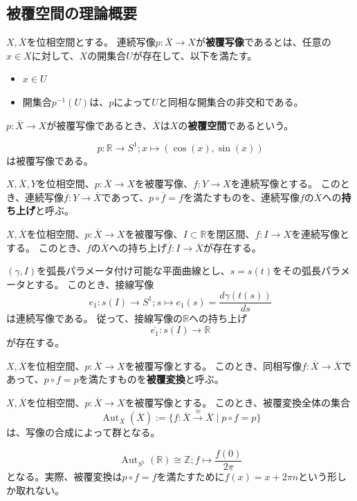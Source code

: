 \subsection{被覆空間の理論概要}
\begin{definition}[被覆空間]
  $X,\overline{X}$を位相空間とする。
  連続写像$p:\overline{X}\to X$が\textbf{被覆写像}であるとは、任意の$x\in X$に対して、$X$の開集合$U$が存在して、以下を満たす。
  \begin{itemize}
    \item $x\in U$
    \item 開集合$p^{-1}(U)$は、$p$によって$U$と同相な開集合の非交和である。
  \end{itemize}
  $p:\overline{X}\to X$が被覆写像であるとき、$\overline{X}$は$X$の\textbf{被覆空間}であるという。
\end{definition}
\begin{example}
  \[
    p:\mathbb{R}\to S^1;x\mapsto(\cos(x),\sin(x))
  \]
  は被覆写像である。
\end{example}

\begin{definition}
  $X,\overline{X},Y$を位相空間、$p:\overline{X}\to X$を被覆写像、$f:Y\to X$を連続写像とする。
  このとき、連続写像$\overline{f}:Y\to\overline{X}$であって、$p\circ\overline{f}=f$を満たすものを、連続写像$f$の$\overline{X}$への\textbf{持ち上げ}と呼ぶ。
\end{definition}
\begin{theorem}[道の持ち上げ定理]
  $X,\overline{X}$を位相空間、$p:\overline{X}\to X$を被覆写像、$I\subset\mathbb{R}$を閉区間、$f:I\to X$を連続写像とする。
  このとき、$f$の$\overline{X}$への持ち上げ$\overline{f}:I\to\overline{X}$が存在する。
\end{theorem}
\begin{example}
  $(\gamma,I)$を弧長パラメータ付け可能な平面曲線とし、$s=s(t)$をその弧長パラメータとする。
  このとき、接線写像
  \[
    e_1:s(I)\to S^1;s\mapsto e_1(s)=\frac{d\gamma(t(s))}{ds}
  \]
  は連続写像である。
  従って、接線写像の$\mathbb{R}$への持ち上げ
  \[
    \overline{e_1}:s(I)\to\mathbb{R}
  \]
  が存在する。
\end{example}

\begin{definition}[被覆変換群]
  $X,\overline{X}$を位相空間、$p:\overline{X}\to X$を被覆写像とする。
  このとき、同相写像$f:\overline{X}\to\overline{X}$であって、$p\circ f=p$を満たすものを\textbf{被覆変換}と呼ぶ。
\end{definition}
\begin{theorem}
  $X,\overline{X}$を位相空間、$p:\overline{X}\to X$を被覆写像とする。
  このとき、被覆変換全体の集合
  \[
    \operatorname{Aut}_X(\overline{X}):=\{f:\overline{X}\overset{\cong}{\longrightarrow}\overline{X}\mid p\circ f=p\}
  \]
  は、写像の合成によって群となる。
\end{theorem}
\begin{example}
  \[
    \operatorname{Aut}_{S^1}(\mathbb{R})\cong\mathbb{Z};f\mapsto \frac{f(0)}{2\pi}
  \]
  となる。実際、被覆変換は$p\circ f=f$を満たすために$f(x)=x+2\pi n$という形しか取れない。
\end{example}

